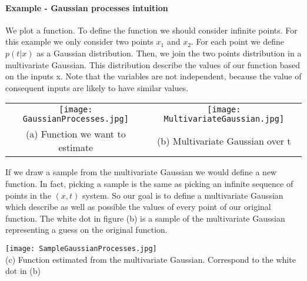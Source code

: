\documentclass[main.tex]{subfiles}
\begin{document}
\paragraph{Example - Gaussian processes intuition}
We plot a function. To define the function we should consider infinite points. For this example we only consider two points $x_1$ and $x_2$. For each point we define $p(t|x)$ as a Gaussian distribution. Then, we join the two points distribution in a multivariate Gaussian. 
This distribution describe the values of our function based on the inputs x. Note that the variables are not independent, because the value of consequent inputs are likely to have similar values.
\newpage
\begin{center}
\begin{tabular}{cc}
    \texttt{[image: GaussianProcesses.jpg]} &
    \texttt{[image: MultivariateGaussian.jpg]} \\
(a) Function we want to estimate & (b) Multivariate Gaussian over t
\end{tabular}
\end{center}
If we draw a sample from the multivariate Gaussian we would define a new function. In fact, picking a sample is the same as picking an infinite sequence of points in the $(x,t)$ system. So our goal is to define a multivariate Gaussian which describe as well as possible the values of every point of our original function. The white dot in figure (b) is a sample of the multivariate Gaussian representing a guess on the original function.
\begin{center}
    \texttt{[image: SampleGaussianProcesses.jpg]} \\
    (c) Function estimated from the multivariate Gaussian. Correspond to the white dot in (b)
\end{center}
\end{document}
